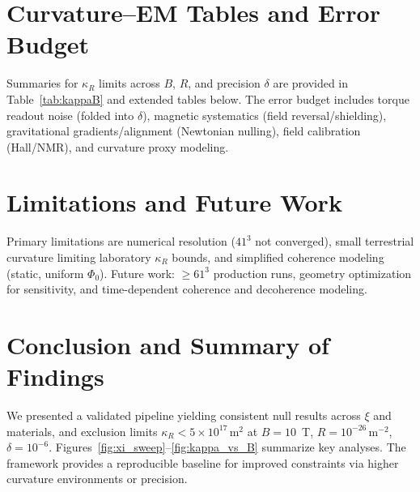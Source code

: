 \documentclass[10pt,twocolumn]{article}
\begin{document}
\appendix
\section{Curvature--EM Tables and Error Budget}
Summaries for $\kappa_R$ limits across $B$, $R$, and precision $\delta$ are provided in Table~\ref{tab:kappaB} and extended tables below. The error budget includes torque readout noise (folded into $\delta$), magnetic systematics (field reversal/shielding), gravitational gradients/alignment (Newtonian nulling), field calibration (Hall/NMR), and curvature proxy modeling.


\section{Limitations and Future Work}
Primary limitations are numerical resolution ($41^3$ not converged), small terrestrial curvature limiting laboratory $\kappa_R$ bounds, and simplified coherence modeling (static, uniform $\Phi_0$). Future work: $\ge 61^3$ production runs, geometry optimization for sensitivity, and time-dependent coherence and decoherence modeling.

\section{Conclusion and Summary of Findings}
We presented a validated pipeline yielding consistent null results across $\xi$ and materials, and exclusion limits $\kappa_R < 5\times10^{17}\,\mathrm{m^2}$ at $B=10$~T, $R=10^{-26}\,\mathrm{m^{-2}}$, $\delta=10^{-6}$. Figures~\ref{fig:xi_sweep}--\ref{fig:kappa_vs_B} summarize key analyses. The framework provides a reproducible baseline for improved constraints via higher curvature environments or precision.
\end{document}

